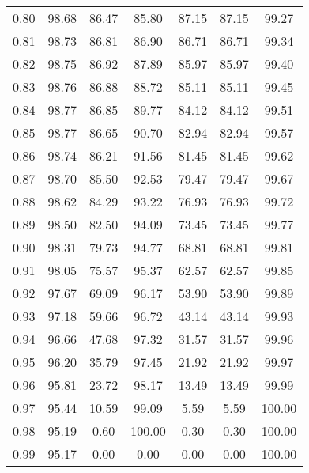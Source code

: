 \begin{tabular}{|c|c|c|c|c|c|c|}
      0.80 &     98.68 &     86.47 &      85.80 &   87.15 &      87.15 &         99.27 \\
      0.81 &     98.73 &     86.81 &      86.90 &   86.71 &      86.71 &         99.34 \\
      0.82 &     98.75 &     86.92 &      87.89 &   85.97 &      85.97 &         99.40 \\
      0.83 &     98.76 &     86.88 &      88.72 &   85.11 &      85.11 &         99.45 \\
      0.84 &     98.77 &     86.85 &      89.77 &   84.12 &      84.12 &         99.51 \\
      0.85 &     98.77 &     86.65 &      90.70 &   82.94 &      82.94 &         99.57 \\
      0.86 &     98.74 &     86.21 &      91.56 &   81.45 &      81.45 &         99.62 \\
      0.87 &     98.70 &     85.50 &      92.53 &   79.47 &      79.47 &         99.67 \\
      0.88 &     98.62 &     84.29 &      93.22 &   76.93 &      76.93 &         99.72 \\
      0.89 &     98.50 &     82.50 &      94.09 &   73.45 &      73.45 &         99.77 \\
      0.90 &     98.31 &     79.73 &      94.77 &   68.81 &      68.81 &         99.81 \\
      0.91 &     98.05 &     75.57 &      95.37 &   62.57 &      62.57 &         99.85 \\
      0.92 &     97.67 &     69.09 &      96.17 &   53.90 &      53.90 &         99.89 \\
      0.93 &     97.18 &     59.66 &      96.72 &   43.14 &      43.14 &         99.93 \\
      0.94 &     96.66 &     47.68 &      97.32 &   31.57 &      31.57 &         99.96 \\
      0.95 &     96.20 &     35.79 &      97.45 &   21.92 &      21.92 &         99.97 \\
      0.96 &     95.81 &     23.72 &      98.17 &   13.49 &      13.49 &         99.99 \\
      0.97 &     95.44 &     10.59 &      99.09 &    5.59 &       5.59 &        100.00 \\
      0.98 &     95.19 &      0.60 &     100.00 &    0.30 &       0.30 &        100.00 \\
      0.99 &     95.17 &      0.00 &       0.00 &    0.00 &       0.00 &        100.00 \\
\bottomrule
\end{tabular}
